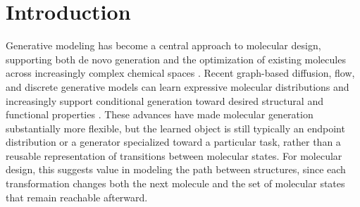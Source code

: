 \section{Introduction}
\label{sec:intro}

Generative modeling has become a central approach to molecular design, supporting both de novo generation and the optimization of existing molecules across increasingly complex chemical spaces \citep{gomezbombarelli2018chemvae,jin2018jtvae,jin2019vjtnn,vignac2023digress,campbell2024multiflow,lee2025genmol}. Recent graph-based diffusion, flow, and discrete generative models can learn expressive molecular distributions and increasingly support conditional generation toward desired structural and functional properties \citep{vignac2023digress,campbell2024multiflow,lee2025genmol}. These advances have made molecular generation substantially more flexible, but the learned object is still typically an endpoint distribution or a generator specialized toward a particular task, rather than a reusable representation of transitions between molecular states. For molecular design, this suggests value in modeling the path between structures, since each transformation changes both the next molecule and the set of molecular states that remain reachable afterward.

